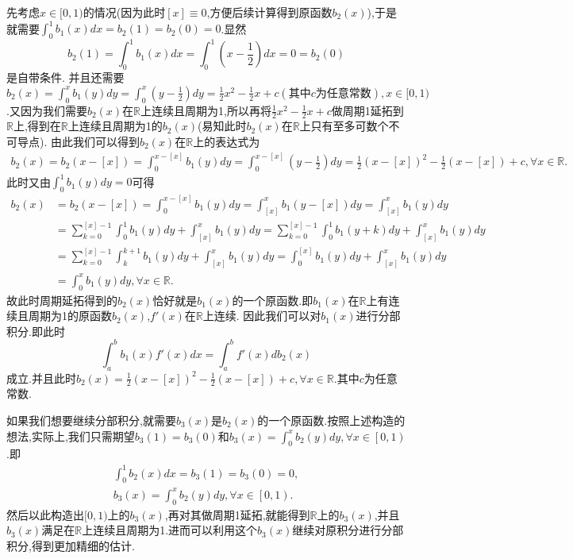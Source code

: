 \documentclass[lang=cn,newtx,10pt,scheme=chinese]{elegantbook}
\begin{document}
\begin{remark}
先考虑$x\in [0,1)$的情况(因为此时$[x]\equiv0$,方便后续计算得到原函数$b_2(x)$),于是就需要\(\int_0^1{b_1(x)dx}=b_2\left( 1 \right) =b_2\left( 0 \right) =0\).显然
\[
b_2(1)=\int_{0}^{1}b_1(x)dx=\int_{0}^{1}\left(x-\frac{1}{2}\right)dx = 0 =b_2(0)
\]
是自带条件.
并且还需要\(b_2(x)=\int_0^x{b_1\left( y \right) dy}=\int_0^x{\left( y-\frac{1}{2} \right) dy}=\frac{1}{2}x^2-\frac{1}{2}x + c(\text{其中}c\text{为任意常数}),x\in[0,1)\).又因为我们需要$b_2(x)$在$\mathbb{R}$上连续且周期为1,所以再将$\frac{1}{2}x^2-\frac{1}{2}x + c$做周期1延拓到$\mathbb{R}$上,得到在$\mathbb{R}$上连续且周期为1的$b_2(x)$(易知此时$b_2(x)$在$\mathbb{R}$上只有至多可数个不可导点).
由此我们可以得到$b_2(x)$在$\mathbb{R}$上的表达式为
\begin{align*}
b_2\left( x \right) =b_2\left( x-\left[ x \right] \right) =\int_0^{x-\left[ x \right]}{b_1\left( y \right) dy}=\int_0^{x-\left[ x \right]}{\left( y-\frac{1}{2} \right) dy}=\frac{1}{2}\left( x-\left[ x \right] \right) ^2-\frac{1}{2}\left( x-\left[ x \right] \right) +c,\forall x\in \mathbb{R} .
\end{align*}
此时又由$\int_0^1{b_1\left( y \right) dy}=0$可得
\begin{align*}
b_2\left( x \right) &=b_2\left( x-\left[ x \right] \right) =\int_0^{x-\left[ x \right]}{b_1\left( y \right) dy}=\int_{\left[ x \right]}^x{b_1\left( y-\left[ x \right] \right) dy}=\int_{\left[ x \right]}^x{b_1\left( y \right) dy}
\\
&=\sum_{k=0}^{\left[ x \right] -1}{\int_0^1{b_1\left( y \right) dy}}+\int_{\left[ x \right]}^x{b_1\left( y \right) dy}=\sum_{k=0}^{\left[ x \right] -1}{\int_0^1{b_1\left( y+k \right) dy}}+\int_{\left[ x \right]}^x{b_1\left( y \right) dy}
\\
&=\sum_{k=0}^{\left[ x \right] -1}{\int_k^{k+1}{b_1\left( y \right) dy}}+\int_{\left[ x \right]}^x{b_1\left( y \right) dy}=\int_0^{\left[ x \right]}{b_1\left( y \right) dy}+\int_{\left[ x \right]}^x{b_1\left( y \right) dy}
\\
&=\int_0^x{b_1\left( y \right) dy},\forall x\in \mathbb{R}.
\end{align*}
故此时周期延拓得到的$b_2(x)$恰好就是$b_1(x)$的一个原函数.即$b_1(x)$在$\mathbb{R}$上有连续且周期为1的原函数$b_2(x)$,$f'(x)$在$\mathbb{R}$上连续.
因此我们可以对$b_1(x)$进行分部积分.即此时
\[
\int_{a}^{b}b_1(x)f'(x)dx=\int_{a}^{b}f'(x)db_2(x)
\]
成立.并且此时$ b_2\left( x \right)=\frac{1}{2}\left( x-\left[ x \right] \right) ^2-\frac{1}{2}\left( x-\left[ x \right] \right) +c,\forall x\in \mathbb{R}$.其中$c$为任意常数.

如果我们想要继续分部积分,就需要$b_3(x)$是$b_2(x)$的一个原函数.按照上述构造的想法,实际上,我们只需期望\(b_3(1)=b_3(0)\)和$b_3(x)=\int_0^x{b_2\left( y \right) dy},\forall x\in \left[ 0,1 \right) $.即
\begin{gather*}
\int_{0}^{1}b_2(x)dx =b_3(1)=b_3(0)= 0,
\\
b_3(x)=\int_0^x{b_2\left( y \right) dy},\forall x\in \left[ 0,1 \right).
\end{gather*}
然后以此构造出$[0,1)$上的$b_3(x)$,再对其做周期1延拓,就能得到$\mathbb{R}$上的$b_3(x)$,并且$b_3(x)$满足在$\mathbb{R}$上连续且周期为1.进而可以利用这个$b_3(x)$继续对原积分进行分部积分,得到更加精细的估计.


\end{remark}
\end{document}

